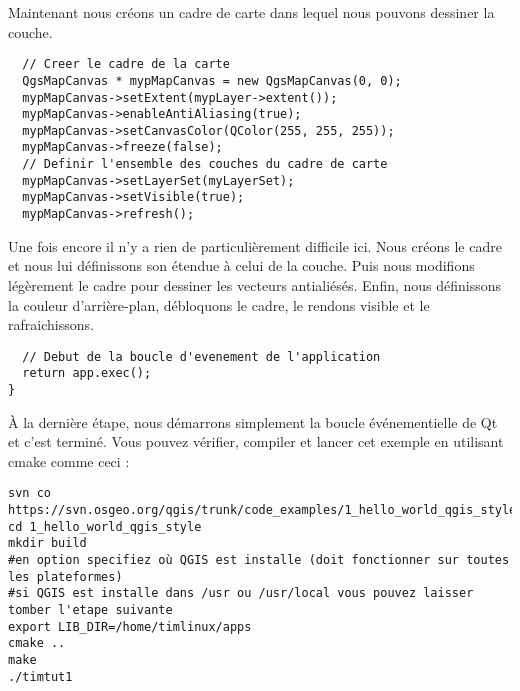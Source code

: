 Maintenant nous créons un cadre de carte dans lequel nous pouvons dessiner la 
couche.

\begin{verbatim}
  // Creer le cadre de la carte
  QgsMapCanvas * mypMapCanvas = new QgsMapCanvas(0, 0);
  mypMapCanvas->setExtent(mypLayer->extent());
  mypMapCanvas->enableAntiAliasing(true);
  mypMapCanvas->setCanvasColor(QColor(255, 255, 255));
  mypMapCanvas->freeze(false);
  // Definir l'ensemble des couches du cadre de carte
  mypMapCanvas->setLayerSet(myLayerSet);
  mypMapCanvas->setVisible(true);
  mypMapCanvas->refresh();

\end{verbatim}

Une fois encore il n'y a rien de particulièrement difficile ici. Nous créons le 
cadre et nous lui définissons son étendue à celui de la couche. Puis nous 
modifions légèrement le cadre pour dessiner les vecteurs antialiésés. Enfin, nous 
définissons la couleur d'arrière-plan, débloquons le cadre, le rendons visible 
et le rafraichissons.

\begin{verbatim}
  // Debut de la boucle d'evenement de l'application
  return app.exec();
}

\end{verbatim}

À la dernière étape, nous démarrons simplement la boucle événementielle de Qt et 
c'est terminé. Vous pouvez vérifier, compiler et lancer cet exemple en 
utilisant cmake comme ceci :

\begin{verbatim}
svn co
https://svn.osgeo.org/qgis/trunk/code_examples/1_hello_world_qgis_style
cd 1_hello_world_qgis_style
mkdir build
#en option specifiez où QGIS est installe (doit fonctionner sur toutes les plateformes)
#si QGIS est installe dans /usr ou /usr/local vous pouvez laisser tomber l'etape suivante
export LIB_DIR=/home/timlinux/apps
cmake ..
make
./timtut1
\end{verbatim}

